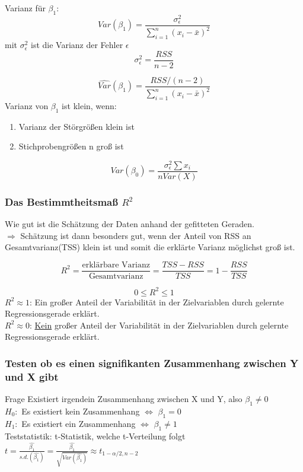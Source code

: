 \documentclass[10pt]{report}
\theoremstyle{definition}
\begin{document}
Varianz für $\beta_1$:
\[ 
	Var(\beta_1)= \frac{\sigma_{\epsilon}^2}{\sum\limits_{i=1}^n (x_i-\bar{x})^2} 
\]
mit $\sigma_{\epsilon}^2$ ist die Varianz der Fehler $\epsilon$
\[\sigma_{\epsilon}^2 = \frac{RSS}{n-2} \]

\[\widehat{Var}(\beta_1)=\frac{RSS/(n-2)}{\sum\limits_{i=1}^n (x_i-\bar{x})^2} \]
Varianz von $\beta_1$ ist klein, wenn:
\begin{enumerate}
	\item Varianz der Störgrößen klein ist
	\item Stichprobengrößen n groß ist
\end{enumerate}
\[Var(\beta_0) = \frac{\sigma_\epsilon^2  \sum x_i}{n Var(X)}\]

\subsubsection{Das Bestimmtheitsmaß $R^2$}
Wie gut ist die Schätzung der Daten anhand der gefitteten Geraden. \\
$\Rightarrow$ Schätzung ist dann besonders gut, wenn der Anteil von RSS an Gesamtvarianz(TSS) klein ist und somit die erklärte Varianz möglichst groß ist.

\[ R^2= \frac{\text{erklärbare Varianz}}{\text{Gesamtvarianz}}
= \frac{TSS-RSS}{TSS} = 1 - \frac{RSS}{TSS}\]

\[ 0 \leq R^2 \leq 1\]
$R^2 \approx 1$: Ein großer Anteil der Variabilität in der Zielvariablen durch gelernte Regressionsgerade erklärt. \\
$R^2 \approx 0$: \underline{Kein} großer Anteil der Variabilität in der Zielvariablen durch gelernte Regressionsgerade erklärt.

\subsubsection{Testen ob es einen signifikanten Zusammenhang zwischen Y und X gibt}
Frage Existiert irgendein Zusammenhang zwischen X und Y, also $\beta_1 \neq 0$\\
$H_0:$ Es existiert kein Zusammenhang $ \Leftrightarrow $ $ \beta_1 = 0$\\
$H_1:$ Es existiert ein Zusammenhang $ \Leftrightarrow $ $\beta_1 \neq 1$\\

Teststatistik: t-Statistik, welche t-Verteilung folgt $t= \frac{\hat{\beta_1}}{s.d.(\hat{\beta_1})} = \frac{\hat{\beta_1}}{\sqrt{Var(\hat{\beta_1})}} \approx t_{1-\alpha/2, n-2}$
\end{document}
